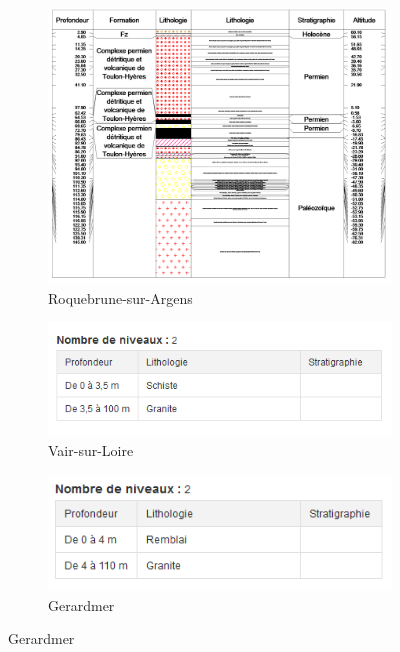 \documentclass[11pt,french,a4paper]{article}
\begin{document}
\begin{figure}
\begin{subfigure}[b]{0.48\textwidth}
         \includegraphics[width=\textwidth]{image/annexe/chap4/minees/roquebrune.png}
         \caption{Roquebrune-sur-Argens}
     \end{subfigure}
     \begin{subfigure}[b]{0.48\textwidth}
         \centering
         \includegraphics[width=\textwidth]{image/annexe/chap4/minees/vairsurloire.png}
         \caption{Vair-sur-Loire}
     \end{subfigure}
     \begin{subfigure}[b]{0.48\textwidth}
         \centering
         \includegraphics[width=\textwidth]{image/annexe/chap4/minees/gerardmer.png}
         \caption{Gerardmer}

\end{subfigure}
\end{figure}
\end{document}
